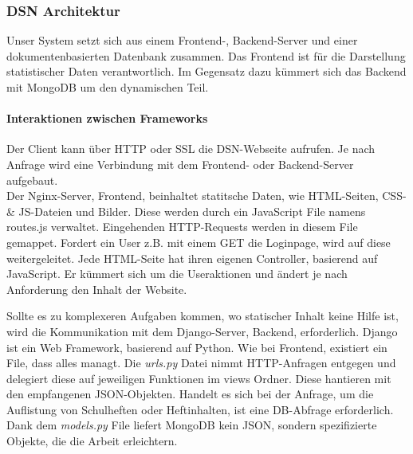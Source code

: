 
\subsubsection{DSN Architektur}
Unser System setzt sich aus einem Frontend-, Backend-Server und einer dokumentenbasierten Datenbank zusammen. Das Frontend ist für die Darstellung statistischer Daten verantwortlich. Im Gegensatz dazu kümmert sich das Backend mit MongoDB um den dynamischen Teil.
\paragraph{Interaktionen zwischen Frameworks}

Der Client kann über HTTP oder SSL die DSN-Webseite aufrufen. Je nach Anfrage wird eine Verbindung mit dem Frontend- oder Backend-Server aufgebaut.\\

Der Nginx-Server, Frontend, beinhaltet statitsche Daten, wie HTML-Seiten, CSS- \& JS-Dateien und Bilder. Diese werden durch ein JavaScript File namens routes.js verwaltet. Eingehenden HTTP-Requests werden in diesem File gemappet. Fordert ein User z.B. mit einem GET die Loginpage, wird auf diese weitergeleitet. Jede HTML-Seite hat ihren eigenen Controller, basierend auf JavaScript. Er kümmert sich um die Useraktionen und ändert je nach Anforderung den Inhalt der Website.\\


Sollte es zu komplexeren Aufgaben kommen, wo statischer Inhalt keine Hilfe ist, wird die Kommunikation mit dem Django-Server, Backend, erforderlich. Django ist ein Web Framework, basierend auf Python. Wie bei Frontend, existiert ein File, dass alles managt. Die \textit{urls.py} Datei nimmt HTTP-Anfragen entgegen und delegiert diese auf jeweiligen Funktionen im views Ordner. Diese hantieren mit den empfangenen JSON-Objekten. Handelt es sich bei der Anfrage, um die Auflistung von Schulheften oder Heftinhalten, ist eine DB-Abfrage erforderlich.\\
Dank dem \textit{models.py} File liefert MongoDB kein JSON, sondern spezifizierte Objekte, die die Arbeit erleichtern.



